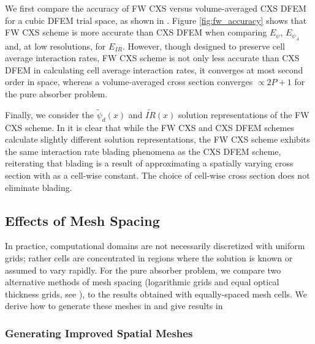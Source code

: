 We first compare the accuracy of FW CXS versus  volume-averaged CXS DFEM for a cubic DFEM trial space, as shown in .  
Figure \ref{fig:fw_accuracy} shows that FW CXS scheme is more accurate than CXS DFEM when comparing $E_{\psi}$, $E_{\psi_A}$ and, at low resolutions, for $E_{IR}$.
However, though designed to preserve cell average interaction rates, FW CXS scheme is not only less accurate than  CXS DFEM in calculating cell average interaction rates, it converges at most second order in space, whereas a volume-averaged cross section converges $\propto 2P+1$ for the pure absorber problem.

Finally, we consider the $\widetilde{\psi}_d(x)$ and $\widetilde{IR}(x)$ solution representations of the FW CXS scheme.  In  it is clear that while the FW CXS and CXS DFEM schemes calculate slightly different solution representations, the FW CXS scheme  exhibits the same interaction rate blading phenomena as the CXS DFEM scheme, reiterating that blading is a result of approximating a spatially varying cross section with as a cell-wise constant.
The choice of cell-wise cross section does not eliminate blading.



\subsection{Effects of Mesh Spacing}

In practice, computational domains are not necessarily discretized with uniform grids; rather cells are concentrated in regions where the solution is known or assumed to vary rapidly.  
For the pure absorber problem, we compare two alternative methods of mesh spacing (logarithmic grids and equal optical thickness grids, see ),
to the results obtained with equally-spaced mesh cells.
We derive how to generate these meshes in  and give results in 
\subsubsection{Generating Improved Spatial Meshes}  


